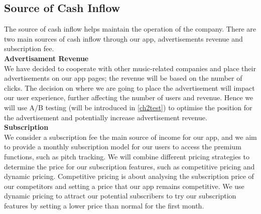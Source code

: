 \subsection{Source of Cash Inflow}
The source of cash inflow helps maintain the operation of the company.  There are two main sources of cash inflow through our app, advertisements revenue and subscription fee. 
\\ \textbf{Advertisament Revenue}
\\ We have decided to cooperate with other music-related companies and place their advertisements on our app pages; the revenue will be based on the number of clicks. The decision on where we are going to place the advertisement will impact our user experience, further affecting the number of users and revenue. Hence we will use A/B testing (will be introduced in \cref{ch2test}) to optimise the position for the advertisement and potentially increase advertisement revenue.
\\ \textbf{Subscription}
\\We consider a subscription fee the main source of income for our app, and we aim to provide a monthly subscription model for our users to access the premium functions, such as pitch tracking. We will combine different pricing strategies to determine the price for our subscription features, such as competitive pricing and dynamic pricing. Competitive pricing is about analysing the subscription price of our competitors and setting a price that our app remains competitive. We use dynamic pricing to attract our potential subscribers to try our subscription features by setting a lower price than normal for the first month.

